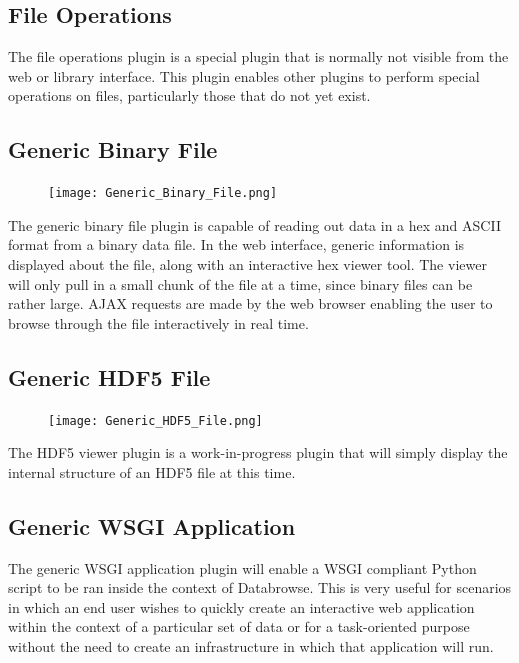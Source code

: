 \documentclass[10pt]{article}
\begin{document}
\endgroup



\begin{changemargin}{0in}{220.6pt}
\subsection{File Operations}
The file operations plugin is a special plugin that is normally not visible from the web or library interface.  This plugin enables other plugins to perform special operations on files, particularly those that do not yet exist.
\end{changemargin}



\begingroup
\setlength\intextsep{0pt}
\subsection{Generic Binary File}
\begin{figure}
		\texttt{[image: Generic\_Binary\_File.png]}
\end{figure}
The generic binary file plugin is capable of reading out data in a hex and ASCII format from a binary data file.  In the web interface, generic information is displayed about the file, along with an interactive hex viewer tool.  The viewer will only pull in a small chunk of the file at a time, since binary files can be rather large.  AJAX requests are made by the web browser enabling the user to browse through the file interactively in real time.

\endgroup

\clearpage
\begingroup
\setlength\intextsep{0pt}
\subsection{Generic HDF5 File}
\begin{figure}
		\texttt{[image: Generic\_HDF5\_File.png]}
\end{figure}
The HDF5 viewer plugin is a work-in-progress plugin that will simply display the internal structure of an HDF5 file at this time.

\endgroup

\hfill \break
\hfill \break
\hfill \break
\hfill \break
\hfill \break
\hfill \break
\hfill \break
\hfill \break
\hfill \break
\hfill \break
\hfill \break
\hfill \break
\hfill \break


\begin{changemargin}{0in}{220.6pt}
\subsection{Generic WSGI Application}
The generic WSGI application plugin will enable a WSGI compliant Python script to be ran inside the context of Databrowse.  This is very useful for scenarios in which an end user wishes to quickly create an interactive web application within the context of a particular set of data or for a task-oriented purpose without the need to create an infrastructure in which that application will run.
\end{changemargin}
\end{document}
